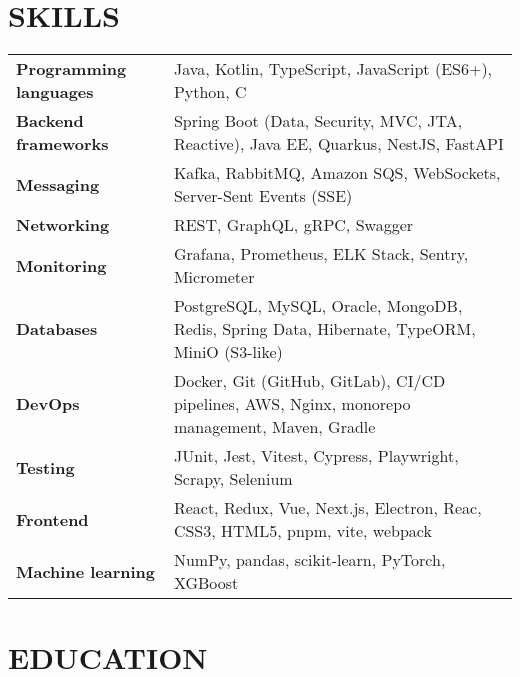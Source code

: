\documentclass[11pt,a4paper]{moderncv}
\begin{document}
\section{SKILLS}
{\renewcommand{\arraystretch}{1.05}
\setlength{\tabcolsep}{4pt} %
\begin{tabularx}{\linewidth}{@{}>{\bfseries}l >{}X@{}}
Programming languages & Java, Kotlin, TypeScript, JavaScript (ES6+), Python, C \\ [0.4em]
Backend frameworks & Spring Boot (Data, Security, MVC, JTA, Reactive), Java EE, Quarkus, NestJS, FastAPI \\ [0.4em]
Messaging & Kafka, RabbitMQ, Amazon SQS, WebSockets, Server-Sent Events (SSE) \\ [0.4em]
Networking & REST, GraphQL, gRPC, Swagger \\ [0.4em]
Monitoring & Grafana, Prometheus, ELK Stack, Sentry, Micrometer \\ [0.25em]
Databases & PostgreSQL, MySQL, Oracle, MongoDB, Redis, Spring Data, Hibernate, TypeORM, MiniO (S3-like) \\ [0.4em]
DevOps & Docker, Git (GitHub, GitLab), CI/CD pipelines, AWS, Nginx, monorepo management, Maven, Gradle \\ [0.4em]
Testing & JUnit, Jest, Vitest, Cypress, Playwright, Scrapy, Selenium \\ [0.4em]
Frontend  & React, Redux, Vue, Next.js, Electron, Reac, CSS3, HTML5, pnpm, vite, webpack \\ [0.25em]
Machine learning & NumPy, pandas, scikit-learn, PyTorch, XGBoost \\
\end{tabularx}
}
\section{EDUCATION}
\vspace{0.5em}
\newlength{\EduGap}
\setlength{\EduGap}{4mm} %
\end{document}

